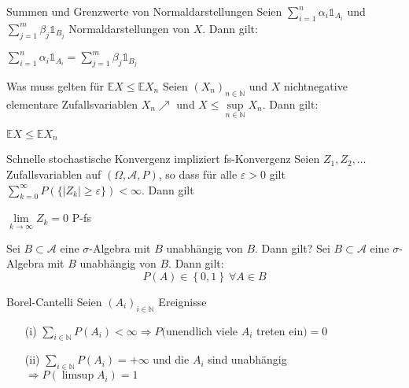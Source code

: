 \documentclass[avery5371,grid,frame]{flashcards} %
\newcommand{\1}{ \mathbb{1} } %
\begin{document}
\begin{flashcard}[Lemma]{Summen und Grenzwerte von Normaldarstellungen}
  Seien $\sum\limits_{i=1}^n \alpha_i \1_{A_i}$ und
  $\sum\limits_{j=1}^m\beta_j\1_{B_j}$ Normaldarstellungen von
  $X$. Dann gilt:
  \begin{center}
    $\sum\limits_{i=1}^n \alpha_i
    \1_{A_i}=\sum\limits_{j=1}^m\beta_j\1_{B_j}$
  \end{center}
\end{flashcard}

\begin{flashcard}[Lemma]{Was muss gelten für $\mathbb{E}X\leq \mathbb{E}X_n$}
  Seien $(X_n)_{n\in \mathbb{N}}$ und $X$ nichtnegative elementare Zufallsvariablen
  $X_n\nearrow$ und $X\leq \sup\limits_{n\in \mathbb{N}} X_n$. Dann
  gilt:
  \begin{center}
    $\mathbb{E}X\leq \mathbb{E}X_n$
  \end{center}
\end{flashcard}

\begin{flashcard}[Lemma]{Schnelle stochastische Konvergenz impliziert fs-Konvergenz}
  Seien $Z_1, Z_2,\ldots$ Zufallsvariablen auf $(\Omega,\mathcal{A},P)$, so dass
  für alle $\varepsilon >0$ gilt $\sum\limits_{k=0}^\infty P(\{|Z_k|\geq
  \varepsilon\})< \infty $. Dann gilt
  \begin{center}
    $\lim\limits_{k \to \infty} Z_k=0$ P-fs
  \end{center}
\end{flashcard}

\begin{flashcard}[Lemma]{  Sei $B\subset\mathcal{A}$ eine $\sigma$-Algebra mit $B$ unabhängig von $B$. Dann gilt?}
  Sei $B\subset\mathcal{A}$ eine $\sigma$-Algebra mit $B$ unabhängig
  von $B$. Dann gilt:
  \[
  P\left(A\right)\in\left\{ 0,1\right\} \ \forall A\in B
  \]
\end{flashcard}

\begin{flashcard}[Lemma]{Borel-Cantelli}
  Seien $\left(A_{i}\right)_{i\in\mathbb{N}}$ Ereignisse
  \begin{itemize}
  \item [{(i)}] $\sum_{i\in\mathbb{N}}P\left(A_{i}\right)<\infty\Rightarrow$$P($unendlich
    viele $A_{i}$ treten ein$)=0$
  \item [{(ii)}] $\sum_{i\in\mathbb{N}}P\left(A_{i}\right)=+\infty$ und
    die $A_{i}$ sind unabhängig $\Rightarrow P\left(\limsup A_{i}\right)=1$
  \end{itemize}
\end{flashcard}
\end{document}
